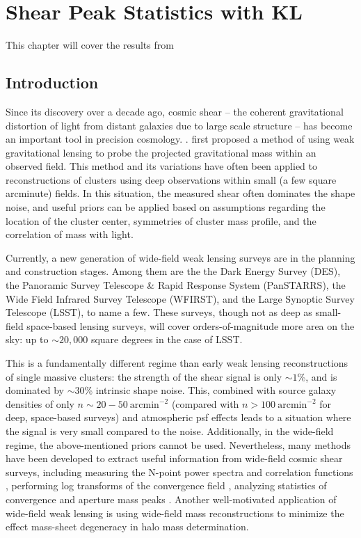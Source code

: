 \chapter{Shear Peak Statistics with KL}

This chapter will cover the results from \citep{Vanderplas2012}


\section{Introduction}
Since its discovery over a decade ago, cosmic shear -- the coherent 
gravitational distortion of light from distant galaxies due to large
scale structure -- has become an important tool in precision cosmology.
\citep[see][for a review]{Bartelmann01}.  
\citet{Kaiser95} first proposed a method of using weak gravitational lensing
to probe the projected gravitational mass within an observed field.  This 
method and its variations have often been applied to reconstructions of
clusters using deep observations within small (a few square arcminute) fields.
In this situation, the measured shear often dominates the shape noise, and 
useful priors can be applied based on assumptions regarding 
the location of the cluster center, symmetries of cluster mass profile, 
and the correlation of mass with light.

Currently, a new generation of wide-field weak lensing surveys are
in the planning and construction stages.  
Among them are the the Dark Energy Survey (DES), 
the Panoramic Survey Telescope \& Rapid
Response System (PanSTARRS), the Wide Field Infrared Survey Telescope (WFIRST),
and the Large Synoptic Survey Telescope (LSST), to name a few.
These surveys, though not as deep as small-field space-based lensing surveys,
will cover orders-of-magnitude more area on the sky: up to $\sim 20,000$
square degrees in the case of LSST.

This is a fundamentally different regime 
than early weak lensing reconstructions
of single massive clusters: the strength of the shear signal is only
$\sim 1$\%, and is dominated by $\sim 30$\% intrinsic shape noise.  
This, combined with source galaxy densities of only 
$n \sim 20-50\ \mathrm{arcmin}^{-2}$
(compared with $n > 100\ \mathrm{arcmin}^{-2}$ for deep, space-based surveys)
and atmospheric psf effects leads to a situation where the signal is 
very small compared to the noise.  
Additionally, in the wide-field regime,
the above-mentioned priors cannot be used.  
Nevertheless, many methods have been developed to extract useful
information from wide-field cosmic shear surveys, including
measuring the N-point power spectra and correlation functions 
\citep{Schneider02,Takada04,Hikage10}, 
performing log transforms of the convergence field 
\citep{Neyrinck09,Neyrinck10,Scherrer10,Seo11},
analyzing statistics of convergence and aperture mass peaks 
\citep{Marian10,Dietrich10,Schmidt10,Kratochvil10,Maturi11}.
Another well-motivated application of wide-field weak lensing 
is using wide-field mass reconstructions to minimize the effect
mass-sheet degeneracy in halo mass determination.

